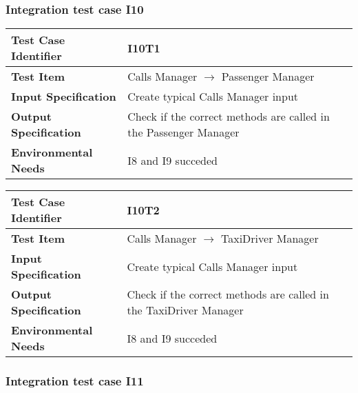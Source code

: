 \subsubsection{Integration test case I10}

\begin{table}[!htbp]
\begin{center}
\begin{tabular}[t]{p{}p{}}

\hline
\textbf{Test Case Identifier} & I10T1 \\
\hline
\textbf{Test Item} & Calls Manager $\rightarrow$ Passenger Manager \\
\hline
\textbf{Input Specification} & Create typical Calls Manager input \\
\hline
\textbf{Output Specification} & Check if the correct methods are called in the Passenger Manager \\
\hline
\textbf{Environmental Needs} & I8 and I9 succeded \\
\hline

\end{tabular}
\end{center}
\end{table}

\begin{table}[!htbp]
\begin{center}
\begin{tabular}[t]{p{}p{}}

\hline
\textbf{Test Case Identifier} & I10T2 \\
\hline
\textbf{Test Item} & Calls Manager $\rightarrow$ TaxiDriver Manager \\
\hline
\textbf{Input Specification} & Create typical Calls Manager input \\
\hline
\textbf{Output Specification} & Check if the correct methods are called in the TaxiDriver Manager \\
\hline
\textbf{Environmental Needs} & I8 and I9 succeded \\
\hline

\end{tabular}
\end{center}
\end{table}
\clearpage


\subsubsection{Integration test case I11}

